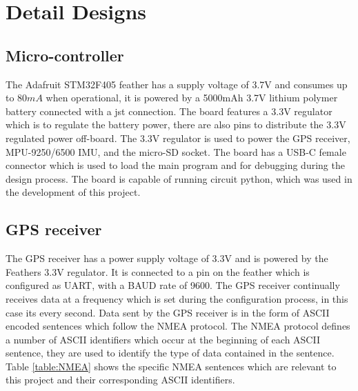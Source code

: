 \graphicspath{{detail_design/fig/}}

\chapter{Detail Designs}
\label{chap:detail_design}

\section{Micro-controller}
The Adafruit STM32F405 feather has a supply voltage of 3.7V and consumes up to $80mA$ when operational, it is powered by a 5000mAh 3.7V lithium polymer 
battery connected with a jst connection. The board features a 3.3V regulator which is to regulate the battery power, there are also pins to distribute 
the 3.3V regulated power off-board. The 3.3V regulator is used to power the GPS receiver, MPU-9250/6500 IMU, and the micro-SD socket. The board has a USB-C 
female connector which is used to load the main program and for debugging during the design process. The board is capable of running circuit python, which was
used in the development of this project. 


\section{GPS receiver}
The GPS receiver has a power supply voltage of 3.3V and is powered by the Feathers 3.3V regulator. It is connected to a pin on the feather which is 
configured as UART, with a BAUD rate of 9600. The GPS receiver continually receives data at a frequency which is set during the configuration process, in 
this case its every second. Data sent by the GPS receiver is in the form of ASCII encoded sentences which follow the NMEA protocol\cite{nmea}. The NMEA 
protocol defines a number of ASCII identifiers which occur at the beginning of each ASCII sentence, they are used to identify the type of data 
contained in the sentence. Table \ref{table:NMEA} shows the specific NMEA sentences which are relevant to this project and their corresponding ASCII 
identifiers.
\\

